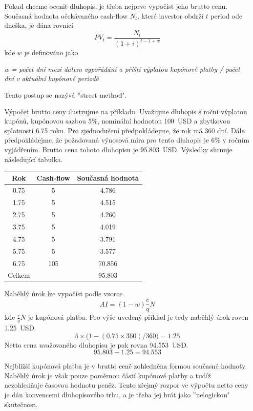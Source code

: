 \documentclass[a4paper]{book}
\begin{document}
Pokud chceme ocenit dluhopis, je třeba nejprve vypočíst jeho brutto cenu. Současná hodnota očekávaného cash-flow $N_t$, které investor obdrží $t$ period ode dneška, je dána rovnicí
\begin{equation*}
PV_t = \frac{N_t}{(1 + i)^{t - 1 + w}}
\end{equation*}
kde $w$ je definováno jako
\begin{center}
\textit{w = počet dní mezi datem vypořádání a příští výplatou kupónové platby / počet dní v aktuální kupónové periodě}
\end{center}
Tento postup se nazývá ''street method".

Výpočet brutto ceny ilustrujme na příkladu. Uvažujme dluhopis s roční výplatou kupónů, kupónovou sazbou 5\%, nominální hodnotou 100~USD a zbytkovou splatností 6.75 roku. Pro zjednodušení předpokládejme, že rok má 360 dní. Dále předpokládejme, že požadovaná výnosová míra pro tento dluhopis je 6\% v ročním vyjádřením. Brutto cena tohoto dluhopisu je 95.803~USD. Výsledky shrnuje následující tabulka.
\begin{center}
\begin{tabular}{c c c}
\textbf{Rok} & \textbf{Cash-flow} & \textbf{Současná hodnota} \\
\hline
0.75 &   5 &  4.786\\
1.75 &   5 &  4.515\\
2.75 &   5 &  4.260\\
3.75 &   5 &  4.019\\
4.75 &   5 &  3.791\\
5.75 &   5 &  3.577\\
6.75 & 105 & 70.856\\
Celkem	&  & 95.803
\end{tabular}
\end{center}

Naběhlý úrok lze vypočíst podle vzorce
\begin{equation*}
AI = (1 - w) \frac{c}{q}N
\end{equation*}
kde $\frac{c}{q}N$ je kupónová platba. Pro výše uvedený příklad je tedy naběhlý úrok roven 1.25~USD.
\begin{equation*}
5 \times \big(1 - (0.75 \times 360) / 360 \big) = 1.25
\end{equation*}
Netto cena uvažovaného dluhopisu je pak rovna 94.553~USD.
\begin{equation*}
95.803 - 1.25 = 94.553
\end{equation*}

Nejbližší kupónová platba je v brutto ceně zohledněna formou současné hodnoty. Naběhlý úrok je však pouze poměrnou částí kupónové platby a tudíž nezohledňuje časovou hodnotu peněz. Tento zřejmý rozpor ve výpočtu netto ceny je dán konvencemi dluhopisového trhu, a je třeba jej brát jako ''nelogickou" skutečnost.
\end{document}
